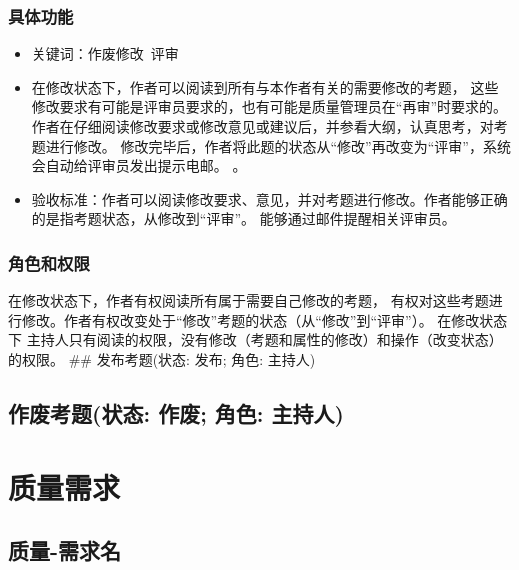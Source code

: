 \documentclass[hyperref, a4paper]{ctexart}
\providecommand{\tightlist}{%
  \setlength{\itemsep}{0pt}\setlength{\parskip}{0pt}}
\begin{document}
\hypertarget{ux5177ux4f53ux529fux80fd}{%
\subsubsection{具体功能}\label{ux5177ux4f53ux529fux80fd}}

\begin{itemize}
\tightlist
\item
  关键词：作废修改~评审
\item
  在修改状态下，作者可以阅读到所有与本作者有关的需要修改的考题，
  这些修改要求有可能是评审员要求的，也有可能是质量管理员在``再审''时要求的。
  作者在仔细阅读修改要求或修改意见或建议后，并参看大纲，认真思考，对考题进行修改。
  修改完毕后，作者将此题的状态从``修改''再改变为``评审''，系统会自动给评审员发出提示电邮。
  。
\item
  验收标准：作者可以阅读修改要求、意见，并对考题进行修改。作者能够正确的是指考题状态，从修改到``评审''。
  能够通过邮件提醒相关评审员。
\end{itemize}

\hypertarget{ux89d2ux8272ux548cux6743ux9650-2}{%
\subsubsection{角色和权限}\label{ux89d2ux8272ux548cux6743ux9650-2}}

在修改状态下，作者有权阅读所有属于需要自己修改的考题，
有权对这些考题进行修改。作者有权改变处于``修改''考题的状态（从``修改''到``评审''）。
在修改状态下
主持人只有阅读的权限，没有修改（考题和属性的修改）和操作（改变状态）的权限。
\#\# 发布考题(状态: 发布; 角色: 主持人)

\hypertarget{ux4f5cux5e9fux8003ux9898ux72b6ux6001-ux4f5cux5e9f-ux89d2ux8272-ux4e3bux6301ux4eba}{%
\subsection{作废考题(状态: 作废; 角色:
主持人)}\label{ux4f5cux5e9fux8003ux9898ux72b6ux6001-ux4f5cux5e9f-ux89d2ux8272-ux4e3bux6301ux4eba}}

\hypertarget{ux8d28ux91cfux9700ux6c42}{%
\section{质量需求}\label{ux8d28ux91cfux9700ux6c42}}

\hypertarget{ux8d28ux91cf-ux9700ux6c42ux540d}{%
\subsection{质量-需求名}\label{ux8d28ux91cf-ux9700ux6c42ux540d}}
\end{document}
